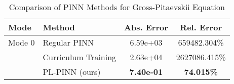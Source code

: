 \begin{table}[htbp]
\centering
\caption{Comparison of PINN Methods for Gross-Pitaevskii Equation}
\label{tab:pinn_comparison}
\begin{tabular}{llcc}
\toprule
Mode & Method & Abs. Error & Rel. Error \\
\midrule
Mode 0 & Regular PINN & 6.59e+03 & 659482.304\% \\
 & Curriculum Training & 2.63e+04 & 2627086.415\% \\
 & PL-PINN (ours) & \textbf{7.40e-01} & \textbf{74.015\%} \\
\bottomrule
\end{tabular}
\end{table}